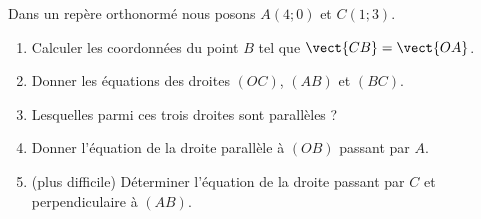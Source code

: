 
\begin{exercice}\label{exosmath-0605}

    Dans un repère orthonormé nous posons \( A(4;0)\) et \( C(1;3)\).
    \begin{enumerate}
        \item
            Calculer les coordonnées du point \( B\) tel que \( \vect{ CB }=\vect{ OA }\).
        \item
            Donner les équations des droites \( (OC)\), \( (AB)\) et \( (BC)\).
        \item
            Lesquelles parmi ces trois droites sont parallèles ?
        \item
            Donner l'équation de la droite parallèle à \( (OB)\) passant par \( A\).
        \item
            (plus difficile) Déterminer l'équation de la droite passant par \( C\) et perpendiculaire à \( (AB)\).
    \end{enumerate}

\end{exercice}
